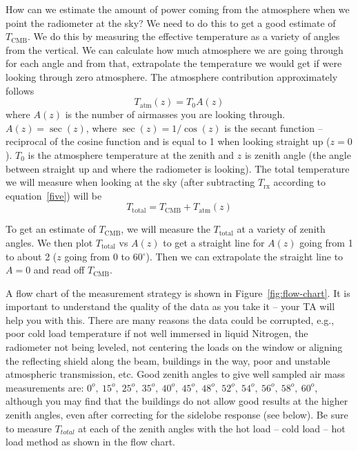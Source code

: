 How can we estimate the amount of power coming from the atmosphere when we point the radiometer at the sky? We need to do this to get a good estimate of $T_\textrm{CMB}$. We do this by measuring the effective temperature as a variety of angles from the vertical. We can calculate how much atmosphere we are going through for each angle and from that, extrapolate the temperature we would get if were looking through zero atmosphere. The atmosphere contribution approximately follows
\begin{equation}
T_\textrm{atm}(z) = T_0 A(z)
\end{equation}
where $A(z)$ is the number of airmasses you are looking through. $A(z)=\sec(z)$, where $\sec(z)=1/\cos(z)$ is the secant function -- reciprocal of the cosine function and is equal to 1 when looking straight up ($z=0$).
$T_0$ is the atmosphere temperature at the zenith and $z$ is zenith angle (the angle between straight up and where the radiometer is looking). The total temperature we will measure when looking at the sky (after subtracting $T_\textrm{rx}$ according to equation~\ref{five}) will be 
\begin{equation}
T_\textrm{total} = T_\textrm{CMB} + T_\textrm{atm}(z)
\label{seven}
\end{equation}

\begin{framed}
To get an estimate of $T_\textrm{CMB}$, we will measure the $T_\textrm{total}$ at a variety of zenith angles. We then plot $T_\textrm{total}$ vs $A(z)$ to get a straight line for $A(z)$ going from 1 to about 2 ($z$ going from 0 to 60$^\circ$). Then we can extrapolate the straight line to $A=0$ and read off $T_\textrm{CMB}$.
\end{framed}

A flow chart of the measurement strategy is shown in Figure~\ref{fig:flow-chart}. It is important to understand the quality of the data as you take it -- your TA will help you with this. There are many reasons the data could be corrupted, e.g., poor cold load temperature if not well immersed in liquid Nitrogen, the radiometer not being leveled, not centering the loads on the window or aligning the reflecting shield along the beam, buildings in the way, poor  and unstable atmospheric transmission, etc.
Good zenith angles to give well sampled air mass measurements are: $0^o,~15^o,~25^o,~35^o,~40^o,~45^o,~48^o,~52^o,~54^o,~56^o,~58^o,~60^o$, although you may find that the buildings do not allow good results at the higher zenith angles, even after correcting for the sidelobe response (see below).   Be sure to 
measure $T_{total}$ at each of the zenith angles with the hot load  -- cold load -- hot load method as shown in the flow chart.  

